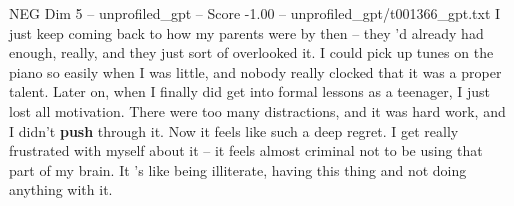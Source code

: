 \begin{textsample}{NEG Dim 5 – unprofiled\_gpt – Score -1.00 – unprofiled\_gpt/t001366\_gpt.txt}  \label{ex:f5_neg_012}
I just keep coming back to how my parents were by then – they ’d already had enough, really, and they just sort of overlooked it.
I could pick up tunes on the piano so easily when I was little, and nobody really clocked that it was a proper talent.
Later on, when I finally did get into formal lessons as a teenager, I just lost all motivation.
There were too many distractions, and it was hard work, and I didn't \textbf{push} through it.
Now it feels like such a deep regret.
I get really frustrated with myself about it – it feels almost criminal not to be using that part of my brain.
It ’s like being illiterate, having this thing and not doing anything with it.

\end{textsample}
